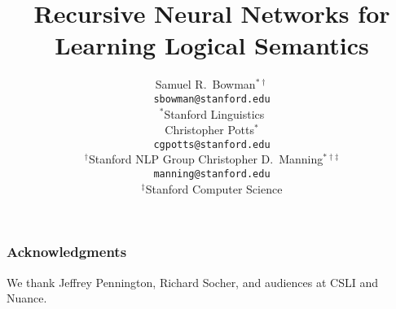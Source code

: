 \documentclass{article} %
\title{Recursive Neural Networks for Learning Logical Semantics}
\author{
Samuel R.\ Bowman$^{\ast\dag}$ \\
\texttt{sbowman@stanford.edu} \\[2ex]
$^{\ast}$Stanford Linguistics \\
\And
Christopher Potts$^{\ast}$\\
\texttt{cgpotts@stanford.edu} \\[2ex]
$^{\dag}$Stanford NLP Group
\And
Christopher D.\ Manning$^{\ast\dag\ddag}$\\
\texttt{manning@stanford.edu}\\[2ex]
$^{\ddag}$Stanford Computer Science
}
\begin{document}
\maketitle








\subsubsection*{Acknowledgments}

We thank Jeffrey Pennington, Richard Socher, and audiences at CSLI and Nuance.




\small %
 
\end{document}
